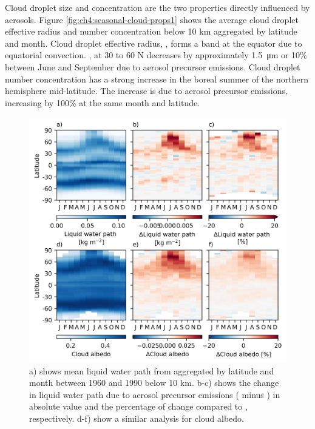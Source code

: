 Cloud droplet size and concentration are the two properties directly influenced by aerosols. Figure \ref{fig:ch4:seasonal-cloud-props1} shows the average cloud droplet effective radius and number concentration below 10 km aggregated by latitude and month. Cloud droplet effective radius, \Reff{}, forms a band at the equator due to equatorial convection. \Reff{}, at 30 to 60 \textdegree N decreases by approximately \qty{1.5}{\micro\metre} or 10\% between June and September due to aerosol precursor emissions. Cloud droplet number concentration has a strong increase in the boreal summer of the northern hemisphere mid-latitude. The increase is due to aerosol precursor emissions, increasing by 100\% at the same month and latitude. 


\begin{figure}
    \centering
    \includegraphics{Chapter4/Figs/seasonal_cloud_props2_pothole.png}
    \caption[Cloud liquid water path and albedo aggregated by latitude and month between 1960 and 1989]{a) shows mean liquid water path from \histsst{} aggregated by latitude and month between 1960 and 1990 below 10 km. b-c) shows the change in liquid water path due to aerosol precursor emissions (\histsst{} minus \sstpiaer{}) in absolute value and the percentage of change compared to \sstpiaer{}, respectively. d-f) show a similar analysis for cloud albedo.}
    \label{fig:ch4:seasonal-cloud-props2}
\end{figure}

